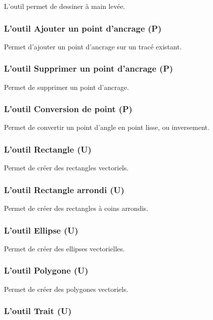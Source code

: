 L'outil  permet de dessiner à main levée.

\subsubsection{L'outil Ajouter un point d'ancrage (P)}

Permet d'ajouter un point d'ancrage sur un tracé existant.

\subsubsection{L'outil Supprimer un point d'ancrage (P)}

Permet de supprimer un point d'ancrage.

\subsubsection{L'outil Conversion de point (P)}

Permet de convertir un point d'angle en point lisse, ou inversement.

\subsubsection{L'outil Rectangle (U)}

Permet de créer des rectangles vectoriels.

\subsubsection{L'outil Rectangle arrondi (U)}

Permet de créer des rectangles à coins arrondis.

\subsubsection{L'outil Ellipse (U)}

Permet de créer des ellipses vectorielles.

\subsubsection{L'outil Polygone (U)}

Permet de créer des polygones vectoriels.

\subsubsection{L'outil Trait (U)}

